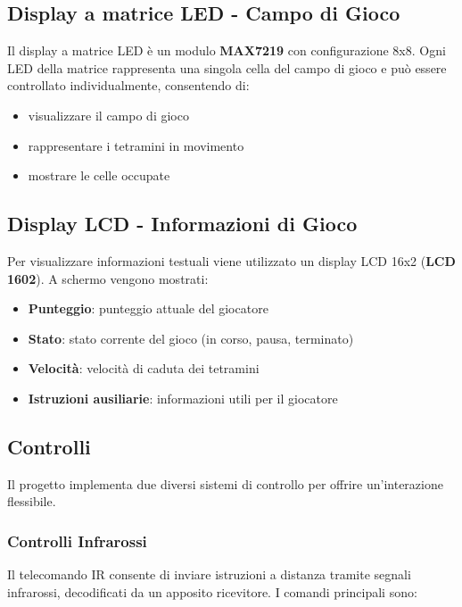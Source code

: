 \documentclass[a4paper, 12pt]{article}
\begin{document}
\subsection{Display a matrice LED - Campo di Gioco}
\label{subsec:display-matrice}
Il display a matrice LED è un modulo \textbf{MAX7219} con configurazione 8x8. Ogni LED della matrice rappresenta una singola cella del campo di gioco e può essere controllato individualmente, consentendo di:
\begin{itemize}
    \item visualizzare il campo di gioco
    \item rappresentare i tetramini in movimento
    \item mostrare le celle occupate
\end{itemize}


\subsection{Display LCD - Informazioni di Gioco}
\label{subsec:display-lcd}
Per visualizzare informazioni testuali viene utilizzato un display LCD 16x2 (\textbf{LCD 1602}). A schermo vengono mostrati:
\begin{itemize}
    \item \textbf{Punteggio}: punteggio attuale del giocatore
    \item \textbf{Stato}: stato corrente del gioco (in corso, pausa, terminato)
    \item \textbf{Velocità}: velocità di caduta dei tetramini
    \item \textbf{Istruzioni ausiliarie}: informazioni utili per il giocatore
\end{itemize}

\subsection{Controlli}
\label{subsec:controlli}
Il progetto implementa due diversi sistemi di controllo per offrire un'interazione flessibile.

\subsubsection{Controlli Infrarossi}
\label{subsubsec:controlli-ir}
Il telecomando IR consente di inviare istruzioni a distanza tramite segnali infrarossi, decodificati da un apposito ricevitore. I comandi principali sono:
\end{document}
